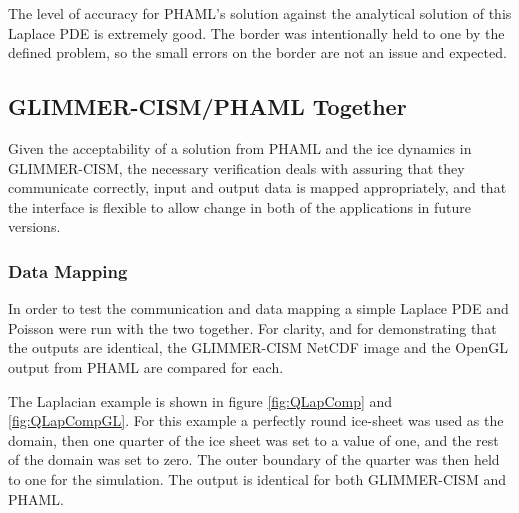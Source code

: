   
  

The level of accuracy for PHAML's solution against the analytical solution of this Laplace PDE is extremely good.  The border was intentionally held to one by the defined problem, so the small errors on the border are not an issue and expected.

\newpage

\subsection{GLIMMER-CISM/PHAML Together}\label{sec:chp5phamlcism}

Given the acceptability of a solution from PHAML and the ice dynamics in GLIMMER-CISM, the necessary verification deals with assuring that they communicate correctly, input and output data is mapped appropriately, and that the interface is flexible to allow change in both of the applications in future versions.

\subsubsection{Data Mapping}

In order to test the communication and data mapping a simple Laplace PDE and Poisson were run with the two together.  For clarity, and for demonstrating that the outputs are identical, the GLIMMER-CISM NetCDF image and the OpenGL output from PHAML are compared for each.

The Laplacian example is shown in figure \ref{fig:QLapComp} and \ref{fig:QLapCompGL}.  For this example a perfectly round ice-sheet was used as the domain, then one quarter of the ice sheet was set to a value of one, and the rest of the domain was set to zero.  The outer boundary of the quarter was then held to one for the simulation.  The output is identical for both GLIMMER-CISM and PHAML.

